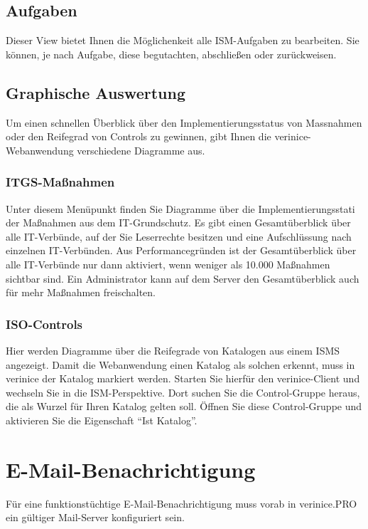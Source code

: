 \documentclass[a4paper,10pt]{book}
\begin{document}
\subsection{Aufgaben}
\label{sec:aufgaben}

Dieser View bietet Ihnen die Möglichenkeit alle ISM-Aufgaben zu
bearbeiten. Sie können, je nach Aufgabe, diese begutachten,
abschließen oder zurückweisen.

\subsection{Graphische Auswertung}

Um einen schnellen Überblick über den Implementierungsstatus von
Massnahmen oder den Reifegrad von Controls zu gewinnen, gibt Ihnen die
verinice-Web\-an\-wendung verschiedene Diagramme aus.

\subsubsection{ITGS-Maßnahmen}
\label{sec:itgs-massnahmen}

Unter diesem Menüpunkt finden Sie Diagramme über die
Implementierungsstati der Maßnahmen aus dem IT-Grundschutz. Es gibt
einen Gesamtüberblick über alle IT-Verbünde, auf der Sie Leserrechte
besitzen und eine Aufschlüssung nach einzelnen IT-Verbünden. Aus 
Performancegründen ist der Gesamtüberblick über alle IT-Verbünde nur dann 
aktiviert, wenn weniger als 10.000 Maßnahmen sichtbar sind. Ein 
Administrator kann auf dem Server den Gesamtüberblick auch für mehr 
Maßnahmen freischalten.

\subsubsection{ISO-Controls}
\label{sec:iso-controls}

Hier werden Diagramme über die Reifegrade von Katalogen aus einem ISMS
angezeigt. Damit die Webanwendung einen Katalog als solchen erkennt,
muss in verinice der Katalog markiert werden. Starten Sie hierfür den
verinice-Client und wechseln Sie in die ISM-Perspektive. Dort suchen
Sie die Control-Gruppe heraus, die als Wurzel für Ihren Katalog gelten
soll. Öffnen Sie diese Control-Gruppe und aktivieren Sie die
Eigenschaft ``Ist Katalog''.


\section{E-Mail-Benachrichtigung} \label{E-Mail-Benachrichtigung}
Für eine funktionstüchtige E-Mail-Benachrichtigung muss vorab in verinice.PRO
ein gültiger Mail-Server konfiguriert sein.
\end{document}
